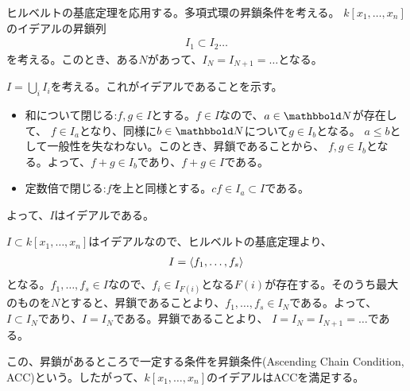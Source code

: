 \documentclass[9pt]{ltjsarticle}
\begin{document}
ヒルベルトの基底定理を応用する。多項式環の昇鎖条件を考える。
$k[x_1,\dots,x_n]$のイデアルの昇鎖列
\begin{align}
  I_1 \subset I_2 \dots
\end{align}
を考える。このとき、ある$N$があって、$I_N = I_{N+1}=\dots$となる。
\begin{myproof}
  $I=\bigcup_{i} I_i$を考える。これがイデアルであることを示す。
  \begin{itemize}
    \item 和について閉じる:$f,g\in I$とする。$f\in I$なので、$a\in \N$が存在して、
    $f \in I_a$となり、同様に$b\in \N$について$g\in I_b$となる。
    $a\le b$として一般性を失なわない。このとき、昇鎖であることから、
    $f,g\in I_b$となる。よって、$f+g \in I_b$であり、$f+g \in I$である。
    \item 定数倍で閉じる:$f$を上と同様とする。$cf \in I_a \subset I$である。
  \end{itemize}
  よって、$I$はイデアルである。

  $I\subset k[x_1,\dots,x_n]$はイデアルなので、ヒルベルトの基底定理より、
  \begin{align}
    I = \left\langle f_1,\dots,f_s \right\rangle
  \end{align}
  となる。$f_1,\dots,f_s \in I$なので、$f_i \in I_{F(i)}$となる$F(i)$が存在する。そのうち最大のものを$N$とすると、昇鎖であることより、$f_1,\dots,f_s \in I_{N}$である。よって、$I\subset I_N$であり、$I = I_N$である。昇鎖であることより、
  $I=I_N = I_{N+1}=\dots$である。
\end{myproof}

この、昇鎖があるところで一定する条件を昇鎖条件(Ascending Chain Condition, ACC)という。したがって、$k[x_1,\dots,x_n]$のイデアルはACCを満足する。
\end{document}
